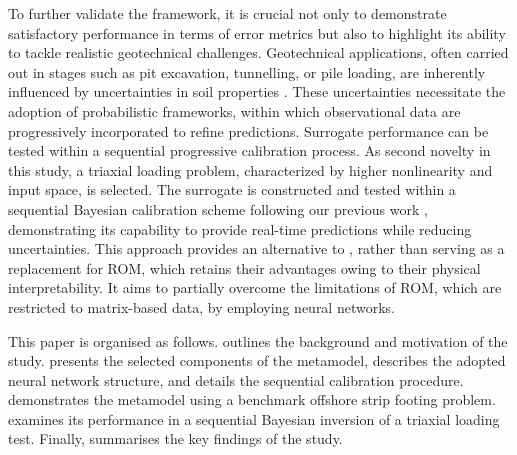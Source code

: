 To further validate the framework, it is crucial not only to demonstrate satisfactory performance in terms of error metrics but also to highlight its ability to tackle realistic geotechnical challenges. Geotechnical applications, often carried out in stages such as pit excavation, tunnelling, or pile loading, are inherently influenced by uncertainties in soil properties \parencite{gardoni2007, wang2010, asem2021,hu2022, buckley2023, gong2023, li2024, zhang2025-1, dai2025,he2025}. These uncertainties necessitate the adoption of probabilistic frameworks, within which observational data are progressively incorporated to refine predictions. Surrogate performance can be tested within a sequential progressive calibration process. As second novelty in this study, a triaxial loading problem, characterized by higher nonlinearity and input space, is selected. The surrogate is constructed and tested within a sequential Bayesian calibration scheme following our previous work \parencite{yang2024}, demonstrating its capability to provide real-time predictions while reducing uncertainties. This approach provides an alternative to \cite{yang2026}, rather than serving as a replacement for ROM, which retains their advantages owing to their physical interpretability. It aims to partially overcome the limitations of ROM, which are restricted to matrix-based data, by employing neural networks.

This paper is organised as follows.  outlines the background and motivation of the study.  presents the selected components of the metamodel, describes the adopted neural network structure, and details the sequential calibration procedure.  demonstrates the metamodel using a benchmark offshore strip footing problem.  examines its performance in a sequential Bayesian inversion of a triaxial loading test. Finally,  summarises the key findings of the study.